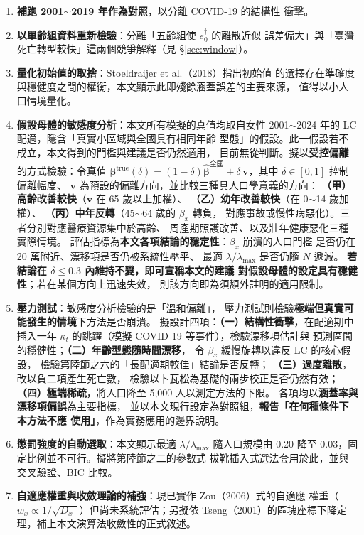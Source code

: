 \documentclass[UTF8, fontset=macnew, a4paper, 12pt]{ctexart}
\newcommand{\edag}{e_0^{\dagger}}
\begin{document}
\begin{enumerate}[leftmargin=*]
  \item \textbf{補跑 2001$\sim$2019 年作為對照}，以分離 COVID-19 的結構性
        衝擊。
  \item \textbf{以單齡組資料重新檢驗}：分離「五齡組使 $\edag$ 的離散近似
        誤差偏大」與「臺灣死亡轉型較快」這兩個競爭解釋（見
        \S\ref{sec:window}）。
  \item \textbf{量化初始值的取捨}：Stoeldraijer et al.（2018）指出初始值
        的選擇存在準確度與穩健度之間的權衡，本文顯示此即殘餘涵蓋誤差的主要來源，
        值得以小人口情境量化。
  \item \textbf{假設母體的敏感度分析}：本文所有模擬的真值均取自女性
        2001$\sim$2024 年的 LC 配適，隱含「真實小區域與全國具有相同年齡
        型態」的假設。此一假設若不成立，本文得到的門檻與建議是否仍然適用，
        目前無從判斷。擬以\textbf{受控偏離}的方式檢驗：令真值
        $\boldsymbol{\beta}^{\text{true}}(\delta)
        =(1-\delta)\hat{\boldsymbol{\beta}}^{\text{全國}}
        +\delta\,\mathbf{v}$，其中 $\delta\in[0,1]$ 控制偏離幅度、
        $\mathbf{v}$ 為預設的偏離方向，並比較三種具人口學意義的方向：
        \textbf{（甲）高齡改善較快}（$\mathbf{v}$ 在 65 歲以上加權）、
        \textbf{（乙）幼年改善較快}（在 0$\sim$14 歲加權）、
        \textbf{（丙）中年反轉}（45$\sim$64 歲的 $\beta_x$ 轉負，
        對應事故或慢性病惡化）。三者分別對應醫療資源集中於高齡、
        周產期照護改善、以及壯年健康惡化三種實際情境。
        評估指標為\textbf{本文各項結論的穩定性}：$\beta_x$ 崩潰的人口門檻
        是否仍在 20 萬附近、漂移項是否仍被系統性壓平、
        最適 $\lambda/\lambda_{\max}$ 是否仍隨 $N$ 遞減。
        \textbf{若結論在 $\delta\le0.3$ 內維持不變，即可宣稱本文的建議
        對假設母體的設定具有穩健性}；若在某個方向上迅速失效，
        則該方向即為須額外註明的適用限制。
  \item \textbf{壓力測試}：敏感度分析檢驗的是「溫和偏離」，
        壓力測試則檢驗\textbf{極端但真實可能發生的情境}下方法是否崩潰。
        擬設計四項：\textbf{（一）結構性衝擊}，在配適期中插入一年
        $\kappa_t$ 的跳躍（模擬 COVID-19 等事件），檢驗漂移項估計與
        預測區間的穩健性；\textbf{（二）年齡型態隨時間漂移}，
        令 $\beta_x$ 緩慢旋轉以違反 LC 的核心假設，
        檢驗第陸節之六的「長配適期較佳」結論是否反轉；
        \textbf{（三）過度離散}，改以負二項產生死亡數，
        檢驗以卜瓦松為基礎的兩步校正是否仍然有效；
        \textbf{（四）極端稀疏}，將人口降至 5,000 人以測定方法的下限。
        各項均以\textbf{涵蓋率與漂移項偏誤}為主要指標，
        並以本文現行設定為對照組，\textbf{報告「在何種條件下本方法不應
        使用」}，作為實務應用的邊界說明。
  \item \textbf{懲罰強度的自動選取}：本文顯示最適 $\lambda/\lambda_{\max}$
        隨人口規模由 0.20 降至 0.03，固定比例並不可行。擬將第陸節之二的參數式
        拔靴插入式選法套用於此，並與交叉驗證、BIC 比較。
  \item \textbf{自適應權重與收斂理論的補強}：現已實作 Zou（2006）式的自適應
        權重（$w_x\propto1/\sqrt{D_{x\cdot}}$）但尚未系統評估；另擬依
        Tseng（2001）的區塊座標下降定理，補上本文演算法收斂性的正式敘述。
\end{enumerate}
\end{document}
